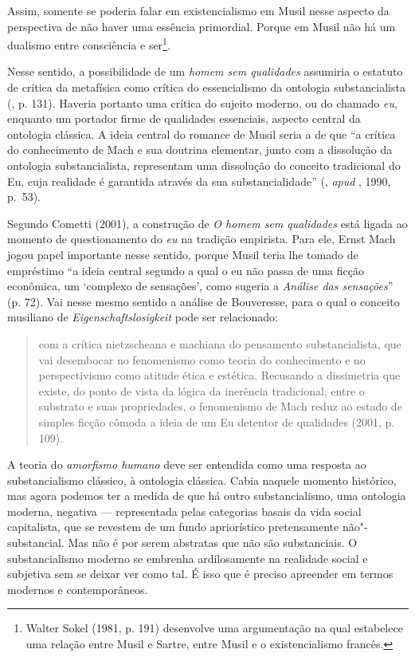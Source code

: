 Assim, somente se poderia falar em existencialismo em Musil nesse
aspecto da perspectiva de não haver uma essência primordial. Porque em
Musil não há um dualismo entre consciência e ser\footnote{Walter Sokel
  (1981, p. 191) desenvolve uma argumentação na qual estabelece uma
  relação entre Musil e Sartre, entre Musil e o existencialismo francês.}.

Nesse sentido, a possibilidade de um \emph{homem sem qualidades} assumiria
o estatuto de crítica da metafísica como crítica do
essencialismo da ontologia substancialista (, p. 131). Haveria
portanto uma crítica do sujeito moderno, ou do chamado \emph{eu},
enquanto um portador firme de qualidades essenciais, aspecto central da
ontologia clássica. A ideia central do romance de Musil seria a de que
``a crítica do conhecimento de Mach e sua doutrina elementar, junto com
a dissolução da ontologia substancialista, representam uma dissolução do
conceito tradicional do Eu, cuja realidade é garantida através da sua
substancialidade'' (, \emph{apud} , 1990, p.~53).

Segundo Cometti (2001), a construção de \emph{O homem sem qualidades}
está ligada ao momento de questionamento do \emph{eu} na tradição
empirista. Para ele, Ernst Mach jogou papel importante nesse sentido,
porque Musil teria lhe tomado de empréstimo ``a ideia central segundo a
qual o eu não passa de uma ficção econômica, um `complexo de sensações',
como sugeria a \emph{Análise das sensações}'' (p. 72). Vai nesse mesmo
sentido a análise de Bouveresse, para o qual o conceito musiliano de
\emph{Eigenschaftslosigkeit} pode ser relacionado:

\begin{quote}
com a crítica nietzscheana e machiana do pensamento substancialista, que
vai desembocar no fenomenismo como teoria do conhecimento e no
perspectivismo como atitude ética e estética. Recusando a dissimetria
que existe, do ponto de vista da lógica da inerência tradicional, entre
o substrato e suas propriedades, o fenomenismo de Mach reduz ao estado
de simples ficção cômoda a ideia de um Eu detentor de qualidades
(2001, p. 109).
\end{quote}

A teoria do \emph{amorfismo humano} deve ser entendida como uma resposta
ao substancialismo clássico, à ontologia clássica. Cabia naquele momento
histórico, mas agora podemos ter a medida de que há outro
substancialismo, uma ontologia moderna, negativa --- representada pelas
categorias basais da vida social capitalista, que se revestem de um
fundo apriorístico pretensamente não"-substancial. Mas não é por serem
abstratas que não são substanciais. O substancialismo moderno se
embrenha ardilosamente na realidade social e subjetiva sem se deixar ver
como tal. É isso que é preciso apreender em termos modernos e
contemporâneos.

